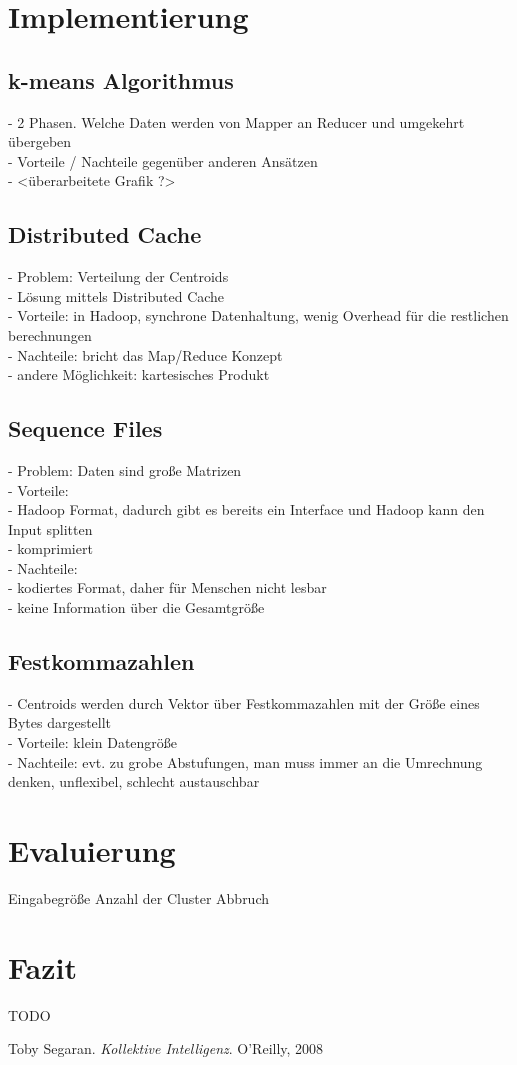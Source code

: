 \documentclass[a4paper]{llncs}
\begin{document}
\section{Implementierung}

\subsection{k-means Algorithmus}
- 2 Phasen. Welche Daten werden von Mapper an Reducer und umgekehrt übergeben\\
- Vorteile / Nachteile gegenüber anderen Ansätzen\\
- <überarbeitete Grafik ?>

\subsection{Distributed Cache}
- Problem: Verteilung der Centroids\\
- Lösung mittels Distributed Cache\\
- Vorteile: in Hadoop, synchrone Datenhaltung, wenig Overhead für die restlichen berechnungen\\
- Nachteile: bricht das Map/Reduce Konzept\\
- andere Möglichkeit: kartesisches Produkt

\subsection{Sequence Files}
- Problem: Daten sind große Matrizen\\
- Vorteile:\\
    - Hadoop Format, dadurch gibt es bereits ein Interface und Hadoop kann den Input splitten\\
    - komprimiert\\
- Nachteile:\\
    - kodiertes Format, daher für Menschen nicht lesbar\\
    - keine Information über die Gesamtgröße

\subsection{Festkommazahlen}
- Centroids werden durch Vektor über Festkommazahlen mit der Größe eines Bytes dargestellt\\
- Vorteile: klein Datengröße\\
- Nachteile: evt. zu grobe Abstufungen, man muss immer an die Umrechnung denken, unflexibel, schlecht austauschbar

\section{Evaluierung}
Eingabegröße
Anzahl der Cluster
Abbruch

\section{Fazit}
TODO

\begin{thebibliography}{--------}

  Toby Segaran.
  {\em Kollektive Intelligenz}.
  O'Reilly, 2008
   
\end{thebibliography}
\end{document}
